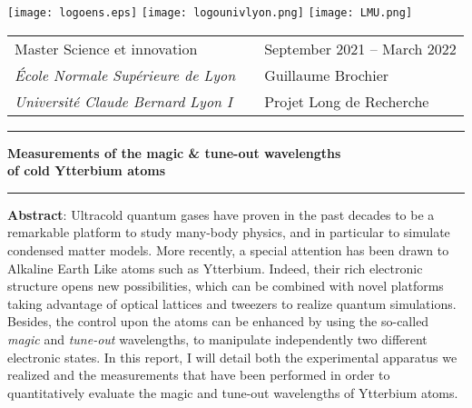 \documentclass[11pt]{article}
\numberwithin{equation}{section}
\numberwithin{figure}{section}
\begin{document}
	
\thispagestyle{empty}
\texttt{[image: logoens.eps]} \hfill 
\texttt{[image: logounivlyon.png]} \hfill \texttt{[image: LMU.png]}

\vspace{1.5cm}

\begin{tabularx}{0.95\textwidth}{@{} l X l @{} }
{\sc Master Science et innovation} & & September 2021 -- March 2022 \\
{\it École Normale Supérieure de Lyon} & & Guillaume Brochier\\
{\it Université Claude Bernard Lyon I} & & Projet Long de Recherche
\end{tabularx}

\begin{center}
	
	\vspace{1cm}
	
	\rule[11pt]{5cm}{0.5pt}
	
	\textbf{\LARGE Measurements of the magic \& tune-out wavelengths \\ 
	\vspace{0.5cm}  
	of cold Ytterbium atoms}
	\vspace{0.3cm}
	
	\rule{5cm}{0.5pt}
	
	\vspace{1.5cm}

\end{center}

\parbox{15cm}{\small \textbf{Abstract}: Ultracold quantum gases have proven in the past decades to be a remarkable platform to study many-body physics, and in particular to simulate condensed matter models. More recently, a special attention has been drawn to Alkaline Earth Like atoms such as Ytterbium. Indeed, their rich electronic structure opens new possibilities, which can be combined with novel platforms taking advantage of optical lattices and tweezers to realize quantum simulations. Besides, the control upon the atoms can be enhanced by using the so-called \emph{magic} and \emph{tune-out} wavelengths, to manipulate independently two different electronic states. In this report, I will detail both the experimental apparatus we realized and the measurements that have been performed in order to quantitatively evaluate the magic and tune-out wavelengths of Ytterbium atoms. %
} %
\end{document}
